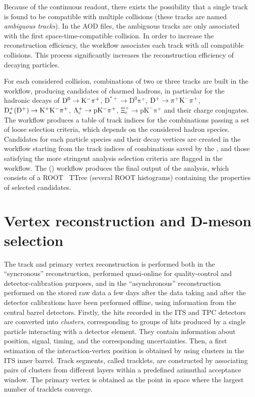 Because of the continuous readout, there exists the possibility that a single track is found to be compatible with multiple collisions (these tracks are named \emph{ambiguous tracks}). In the AOD files, the ambiguous tracks are only associated with the first space-time-compatible collision. In order to increase the reconstruction efficiency, the  workflow associates each track with all compatible collisions. This process significantly increases the reconstruction efficiency of decaying particles.

\begin{sloppypar}
For each considered collision, combinations of two or three tracks are built in the  workflow, producing candidates of charmed hadrons, in particular for the hadronic decays of $\mathrm{D^0}\rightarrow\mathrm{K^-\pi^+}$, $\mathrm{D^{*+}}\rightarrow\mathrm{D^0\pi^+}$, $\mathrm{D^+}\rightarrow\pi^+\mathrm{K^-}\pi^+$, \mbox{$\mathrm{D_s^+}(\mathrm{D^+})\rightarrow\mathrm{K^+K^-\pi^+}$}, $\mathrm{\Lambda_c^+}\rightarrow\mathrm{pK^-\pi^+}$, $\mathrm{\Xi_c^+}\rightarrow\mathrm{pK^-\pi^+}$ and their charge conjugates. The workflow produces a table of track indices for the combinations passing a set of loose selection criteria, which depends on the considered hadron species. Candidates for each particle species and their decay vertices are created in the  workflow starting from the track indices of combinations saved by the , and those satisfying the more stringent analysis selection criteria are flagged in the  workflow. The  () workflow produces the final output of the analysis, which consists of a ROOT~\cite{Brun:1997pa} TTree (several ROOT histograms) containing the properties of selected candidates.
\end{sloppypar}

\section{Vertex reconstruction and D-meson selection}

The track and primary vertex reconstruction is performed both in the ``syncronous'' reconstruction, performed quasi-online for quality-control and detector-calibration purposes, and in the ``asynchronous'' reconstruction performed on the stored raw data a few days after the data taking and after the detector calibrations have been performed offline, using information from the central barrel detectors. Firstly, the hits recorded in the ITS and TPC detectors are converted into \emph{clusters}, corresponding to groups of hits produced by a single particle interacting with a detector element. They contain information about position, signal, timing, and the corresponding uncertainties. Then, a first estimation of the interaction-vertex position is obtained by using clusters in the ITS inner barrel. Track segments, called tracklets, are constructed by associating pairs of clusters from different layers within a predefined azimuthal acceptance window. The primary vertex is obtained as the point in space where the largest number of tracklets converge. 


